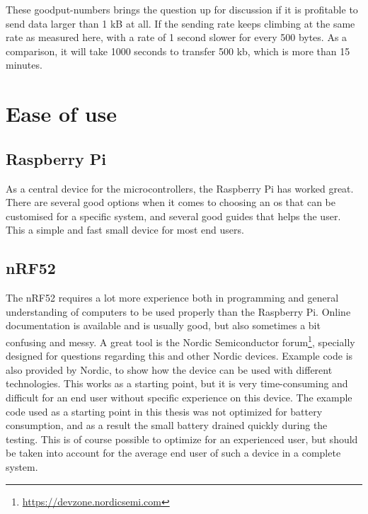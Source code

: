 \noindent These \gls{goodput}-numbers brings the question up for discussion if it is profitable to send data larger than 1 kB at all. If the sending rate keeps climbing at the same rate as measured here, with a rate of 1 second slower for every 500 bytes. As a comparison, it will take 1000 seconds to transfer 500 kb, which is more than 15 minutes. 


\section{Ease of use}


\subsection{Raspberry Pi}

\noindent As a central device for the \glspl{microcontroller}, the \gls{Raspberry Pi} has worked great. There are several good options when it comes to choosing an \gls{os} that can be customised for a specific system, and several good guides that helps the user. This a simple and fast small device for most end users. 


\subsection{nRF52}

\noindent The \gls{nRF52} requires a lot more experience both in programming and general understanding of computers to be used properly than the \gls{Raspberry Pi}. Online documentation is available and is usually good, but also sometimes a bit confusing and messy. A great tool is the Nordic Semiconductor forum\footnote{\url{https://devzone.nordicsemi.com}}, specially designed for questions regarding this and other Nordic devices. Example code is also provided by Nordic, to show how the device can be used with different technologies. This works as a starting point, but it is very time-consuming and difficult for an end user without specific experience on this device. The example code used as a starting point in this thesis was not optimized for battery consumption, and as a result the small battery drained quickly during the testing. This is of course possible to optimize for an experienced user, but should be taken into account for the average end user of such a device in a complete system. 





